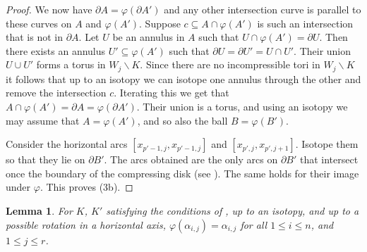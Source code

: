 \documentclass[12pt,reqno]{amsart}
\theoremstyle{plain}
\newtheorem{lemma}[theorem]{Lemma}
\theoremstyle{definition}
\newcommand{\ssm}{\smallsetminus}
\begin{document}
\begin{proof}
We now have $\partial A = \varphi(\partial A')$ and any other intersection 
curve is parallel to these curves on $A$ and $\varphi(A')$.
Suppose $c\subseteq A\cap \varphi(A')$ is such an intersection that is not in $\partial A$.
Let $U$ be an annulus in $A$ such that $U\cap \varphi(A') = \partial U$. Then there 
exists an annulus $U'\subseteq \varphi(A')$ such that $\partial U = \partial U' = U\cap U'$. 
Their union $U\cup U'$ forms a torus in $W_j \ssm K$. Since there are no incompressible 
tori in $W_j\ssm K$ it follows that up to an isotopy we can isotope one annulus 
through the other and remove the intersection $c$. Iterating this we get 
that $A\cap \varphi(A') = \partial A = \varphi(\partial A')$. 
Their union is a torus, and using an isotopy we may assume that 
$A=\varphi(A')$, and so also the ball $B = \varphi(B')$.

Consider the horizontal arcs $[x_{p'-1,j},x_{p'-1,j}]$ and $[x_{p',j},x_{p',j+1}]$. 
Isotope them so that they lie on $\partial B'$. 
The arcs obtained are the only arcs on $\partial B'$ that intersect once the boundary 
of the compressing disk (see ).
The same holds for their image under $\varphi$. This proves (3b).
\end{proof}

\begin{lemma}\label{lem: permutations}
For $K$, $K'$ satisfying the conditions of , up to an 
isotopy, and up to a  possible rotation in a horizontal axis, 
$\varphi(\alpha_{i,j}) = \alpha_{i,j}$ for all $1\le i\le n$, and $1\le j\le r$. 
\end{lemma}
\end{document}
